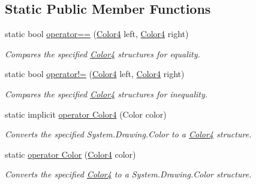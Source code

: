 \subsection*{Static Public Member Functions}
\begin{DoxyCompactItemize}
\item 
static bool \hyperlink{struct_open_t_k_1_1_graphics_1_1_color4_afb453f1695be56179a812ba12e5be4cd}{operator==} (\hyperlink{struct_open_t_k_1_1_graphics_1_1_color4}{Color4} left, \hyperlink{struct_open_t_k_1_1_graphics_1_1_color4}{Color4} right)
\begin{DoxyCompactList}\small\item\em Compares the specified \hyperlink{struct_open_t_k_1_1_graphics_1_1_color4}{Color4} structures for equality. \end{DoxyCompactList}\item 
static bool \hyperlink{struct_open_t_k_1_1_graphics_1_1_color4_a99ee5e1952d8b2c0cbfdd4dd3e984c3b}{operator!=} (\hyperlink{struct_open_t_k_1_1_graphics_1_1_color4}{Color4} left, \hyperlink{struct_open_t_k_1_1_graphics_1_1_color4}{Color4} right)
\begin{DoxyCompactList}\small\item\em Compares the specified \hyperlink{struct_open_t_k_1_1_graphics_1_1_color4}{Color4} structures for inequality. \end{DoxyCompactList}\item 
static implicit \hyperlink{struct_open_t_k_1_1_graphics_1_1_color4_af12f36079bc929a24e98064265229d2b}{operator Color4} (Color color)
\begin{DoxyCompactList}\small\item\em Converts the specified System.\-Drawing.\-Color to a \hyperlink{struct_open_t_k_1_1_graphics_1_1_color4}{Color4} structure. \end{DoxyCompactList}\item 
static \hyperlink{struct_open_t_k_1_1_graphics_1_1_color4_ad8da5becba7c8b00f42260ee5d227e9a}{operator Color} (\hyperlink{struct_open_t_k_1_1_graphics_1_1_color4}{Color4} color)
\begin{DoxyCompactList}\small\item\em Converts the specified \hyperlink{struct_open_t_k_1_1_graphics_1_1_color4}{Color4} to a System.\-Drawing.\-Color structure. \end{DoxyCompactList}\end{DoxyCompactItemize}
